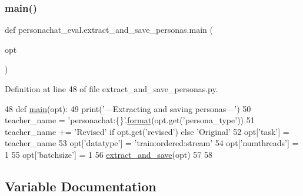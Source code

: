 \mbox{\label{namespacepersonachat__eval_1_1extract__and__save__personas_aa39f496bc78dfa28c1fbc2c4129a915c}} 
\subsubsection{\texorpdfstring{main()}{main()}}
{\footnotesize\ttfamily def personachat\+\_\+eval.\+extract\+\_\+and\+\_\+save\+\_\+personas.\+main (\begin{DoxyParamCaption}\item[{}]{opt }\end{DoxyParamCaption})}



Definition at line 48 of file extract\+\_\+and\+\_\+save\+\_\+personas.\+py.


\begin{DoxyCode}
48 \textcolor{keyword}{def }\hyperlink{namespacepersonachat__eval_1_1extract__and__save__personas_aa39f496bc78dfa28c1fbc2c4129a915c}{main}(opt):
49     print(\textcolor{stringliteral}{'---Extracting and saving personas---'})
50     teacher\_name = \textcolor{stringliteral}{'personachat:\{\}'}.\hyperlink{namespaceparlai_1_1chat__service_1_1services_1_1messenger_1_1shared__utils_a32e2e2022b824fbaf80c747160b52a76}{format}(opt.get(\textcolor{stringliteral}{'persona\_type'}))
51     teacher\_name += \textcolor{stringliteral}{'Revised'} \textcolor{keywordflow}{if} opt.get(\textcolor{stringliteral}{'revised'}) \textcolor{keywordflow}{else} \textcolor{stringliteral}{'Original'}
52     opt[\textcolor{stringliteral}{'task'}] = teacher\_name
53     opt[\textcolor{stringliteral}{'datatype'}] = \textcolor{stringliteral}{'train:ordered:stream'}
54     opt[\textcolor{stringliteral}{'numthreads'}] = 1
55     opt[\textcolor{stringliteral}{'batchsize'}] = 1
56     \hyperlink{namespacepersonachat__eval_1_1extract__and__save__personas_a7bae99c34a0b3f49cbce1328146926fd}{extract\_and\_save}(opt)
57 
58 
\end{DoxyCode}


\subsection{Variable Documentation}
\mbox{\label{namespacepersonachat__eval_1_1extract__and__save__personas_a62bbb0f78fbe1dca79fe9a5c30586588}} 
